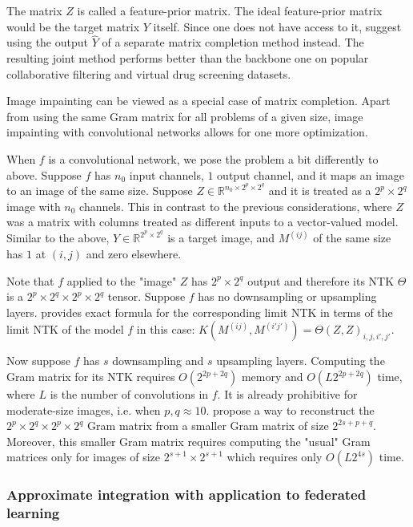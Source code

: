 \documentclass{article}
\newcommand{\RR}{\mathbb{R}}
\begin{document}
    The matrix $Z$ is called a feature-prior matrix.
    The ideal feature-prior matrix would be the target matrix $Y$ itself.
    Since one does not have access to it, \cite{radhakrishnan2021simple} suggest using the output $\hat Y$ of a separate matrix completion method instead.
    The resulting joint method performs better than the backbone one on popular collaborative filtering and virtual drug screening datasets.

    Image impainting can be viewed as a special case of matrix completion.
    Apart from using the same Gram matrix for all problems of a given size, image impainting with convolutional networks allows for one more optimization.
    
    When $f$ is a convolutional network, we pose the problem a bit differently to above.
    Suppose $f$ has $n_0$ input channels, $1$ output channel, and it maps an image to an image of the same size.
    Suppose $Z \in \RR^{n_0 \times 2^p \times 2^q}$ and it is treated as a $2^p \times 2^q$ image with $n_0$ channels.
    This in contrast to the previous considerations, where $Z$ was a matrix with columns treated as different inputs to a vector-valued model.
    Similar to the above, $Y \in \RR^{2^p \times 2^q}$ is a target image, and $M^{(ij)}$ of the same size has $1$ at $(i,j)$ and zero elsewhere.

    Note that $f$ applied to the "image" $Z$ has $2^p \times 2^q$ output and therefore its NTK $\Theta$ is a $2^p \times 2^q \times 2^p \times 2^q$ tensor.
    Suppose $f$ has no downsampling or upsampling layers.
    \cite{radhakrishnan2021simple} provides exact formula for the corresponding limit NTK in terms of the limit NTK of the model $f$ in this case: $K(M^{(ij)}, M^{(i'j')}) = \Theta(Z,Z)_{i,j,i',j'}$.

    Now suppose $f$ has $s$ downsampling and $s$ upsampling layers.
    Computing the Gram matrix for its NTK requires $O(2^{2p+2q})$ memory and $O(L 2^{2p+2q})$ time, where $L$ is the number of convolutions in $f$.
    It is already prohibitive for moderate-size images, i.e. when $p, q \approx 10$.
    \cite{radhakrishnan2021simple} propose a way to reconstruct the $2^p \times 2^q \times 2^p \times 2^q$ Gram matrix from a smaller Gram matrix of size $2^{2s+p+q}$.
    Moreover, this smaller Gram matrix requires computing the "usual" Gram matrices only for images of size $2^{s+1} \times 2^{s+1}$ which requires only $O(L 2^{4s})$ time.


    \subsubsection{Approximate integration with application to federated learning}
\end{document}
